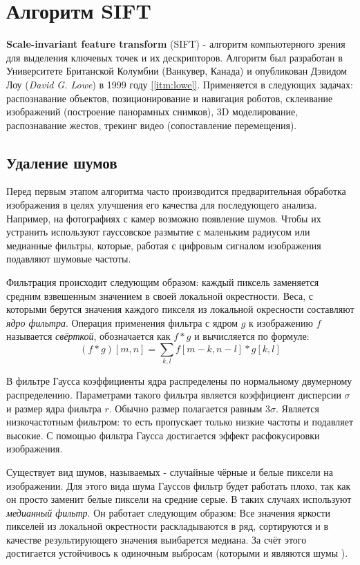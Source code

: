 \section{Алгоритм SIFT}

\textbf{Scale-invariant feature transform} (SIFT) - алгоритм компьютерного зрения для выделения ключевых точек и их дескрипторов. Алгоритм был разработан в Университете Британской Колумбии (Ванкувер, Канада) и опубликован Дэвидом Лоу (\textit{David G. Lowe}) в 1999 году \hyperref[itm:lowe]{[\ref{itm:lowe}]}. Применяется в следующих задачах: распознавание объектов, позиционирование и навигация роботов, склеивание изображений (построение панорамных снимков), 3D моделирование, распознавание жестов, трекинг видео (сопоставление перемещения).

\subsection{Удаление шумов}

Перед первым этапом алгоритма часто производится предварительная обработка изображения в целях улучшения его качества для последующего анализа. Например, на фотографиях с камер возможно появление шумов. Чтобы их устранить используют гауссовское размытие с маленьким радиусом или медианные фильтры, которые, работая с цифровым сигналом изображения подавляют шумовые частоты.

Фильтрация происходит следующим образом: каждый пиксель заменяется средним взвешенным значением в своей локальной окрестности. Веса, с которыми берутся значения каждого пикселя из локальной окресности составляют \textit{ядро фильтра}. Операция применения фильтра с ядром $g$ к изображению $f$ называется \textit{свёрткой}, обозначается как $f * g$ и вычисляется по формуле:
\begin{equation}
    (f * g)[m, n] = \sum_{k, l} f[m - k, n - l] * g[k, l]
\end{equation}

В фильтре Гаусса коэффициенты ядра распределены по нормальному двумерному распределению. Параметрами такого фильтра является коэффициент дисперсии $\sigma$ и размер ядра фильтра $r$. Обычно размер полагается равным $3\sigma$. Является низкочастотным фильтром: то есть пропускает только низкие частоты и подавляет высокие. С помощью фильтра Гаусса достигается эффект расфокусировки изображения.

Существует вид шумов, называемых  - случайные чёрные и белые пиксели на изображении. Для этого вида шума Гауссов фильтр будет работать плохо, так как он просто заменит белые пиксели на средние серые. В таких случаях используют \textit{медианный фильтр}. Он работает следующим образом: Все значения яркости пикселей из локальной окрестности раскладываются в ряд, сортируются и в качестве результирующего значения выибарется медиана. За счёт этого достигается устойчивось к одиночным выбросам (которыми и являются шумы ).

